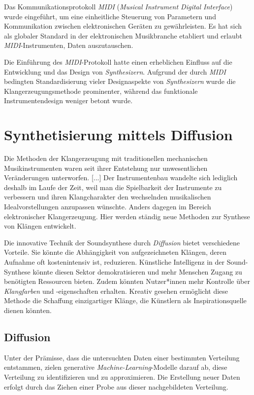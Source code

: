 \documentclass[
  a4paper,  %
  twoside,  %
  bibliography=totoc,
  headsepline,
  cleardoublepage=empty,
  parskip=half,
  draft=false
]{scrbook}
\begin{document}
Das Kommunikationsprotokoll \emph{MIDI} (\emph{Musical Instrument Digital Interface}) \cite{midi_association_midi_nodate} wurde eingeführt, um eine einheitliche Steuerung von Parametern und Kommunikation zwischen elektronischen Geräten zu gewährleisten. Es hat sich als globaler Standard in der elektronischen Musikbranche etabliert und erlaubt \emph{MIDI}-Instrumenten, Daten auszutauschen. \cite{ruschkowski_elektronische_2019}

Die Einführung des \emph{MIDI}-Protokoll hatte einen erheblichen Einfluss auf die Entwicklung und das Design von \emph{Synthesizern}. Aufgrund der durch \emph{MIDI} bedingten Standardisierung vieler Designaspekte von \emph{Synthesizern} wurde die Klangerzeugungsmethode prominenter, während das funktionale Instrumentendesign weniger betont wurde. \cite{russ_sound_2009}

\section{Synthetisierung mittels Diffusion}

\glqq Die Methoden der Klangerzeugung mit traditionellen mechanischen Musikinstrumenten waren seit ihrer Entstehung nur unwesentlichen Veränderungen unterworfen. [...] Der Instrumentenbau wandelte sich lediglich deshalb im Laufe der Zeit, weil man die Spielbarkeit der Instrumente zu verbessern und ihren Klangcharakter den wechselnden musikalischen Idealvorstellungen anzupassen wünschte. Anders dagegen im Bereich elektronischer Klangerzeugung. Hier werden ständig neue Methoden zur Synthese von Klängen entwickelt.\grqq \, \cite{ruschkowski_elektronische_2019}

Die innovative Technik der Soundsynthese durch \emph{Diffusion} bietet verschiedene Vorteile. Sie könnte die Abhängigkeit von aufgezeichneten Klängen, deren Aufnahme oft kostenintensiv ist, reduzieren. Künstliche Intelligenz in der Sound-Synthese könnte diesen Sektor demokratisieren und mehr Menschen Zugang zu benötigten Ressourcen bieten. Zudem könnten Nutzer*innen mehr Kontrolle über \emph{Klangfarben} und -eigenschaften erhalten. Kreativ gesehen ermöglicht diese Methode die Schaffung einzigartiger Klänge, die Künstlern als Inspirationsquelle dienen könnten. \cite{haohe_liu_audioldm_2023}


\subsection{Diffusion}
Unter der Prämisse, dass die untersuchten Daten einer bestimmten Verteilung entstammen, zielen generative \emph{Machine-Learning}-Modelle darauf ab, diese Verteilung zu identifizieren und zu approximieren. Die Erstellung neuer Daten erfolgt durch das Ziehen einer Probe aus dieser nachgebildeten Verteilung. \cite{machine_learning_at_berkeley_diffusion_2022}
\end{document}
